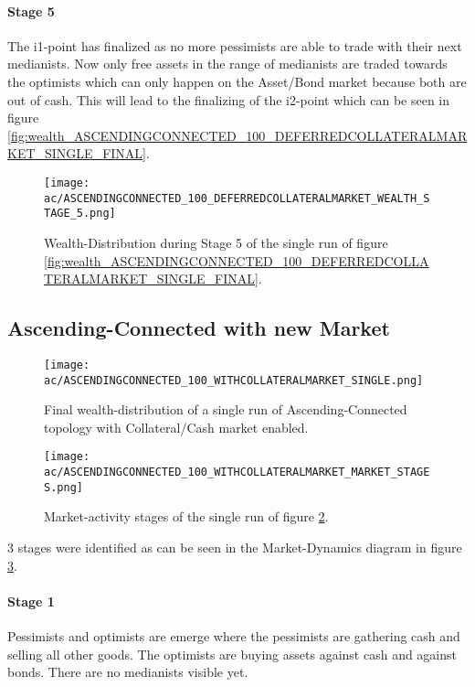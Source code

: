 \documentclass[Bachelorarbeit.tex]{subfiles}
\begin{document}
\paragraph{Stage 5}
The i1-point has finalized as no more pessimists are able to trade with their next medianists. Now only free assets in the range of medianists are traded towards the optimists which can only happen on the Asset/Bond market because both are out of cash. This will lead to the finalizing of the i2-point which can be seen in figure \ref{fig:wealth_ASCENDINGCONNECTED_100_DEFERREDCOLLATERALMARKET_SINGLE_FINAL}.
 
\begin{figure}[H]
	\centering
  \texttt{[image: ac/ASCENDINGCONNECTED\_100\_DEFERREDCOLLATERALMARKET\_WEALTH\_STAGE\_5.png]}
  	\caption{Wealth-Distribution during Stage 5 of the single run of figure \ref{fig:wealth_ASCENDINGCONNECTED_100_DEFERREDCOLLATERALMARKET_SINGLE_FINAL}.}
  	\label{fig:markets_ASCENDINGCONNECTED_100_DEFERREDCOLLATERALMARKET_WEALTH_STAGE_5}
\end{figure}

\subsection{Ascending-Connected with new Market}

\begin{figure}[H]
	\centering
  \texttt{[image: ac/ASCENDINGCONNECTED\_100\_WITHCOLLATERALMARKET\_SINGLE.png]}
  	\caption{Final wealth-distribution of a single run of Ascending-Connected topology with Collateral/Cash market enabled.}
	\label{fig:wealth_ASCENDINGCONNECTED_100_WITHCOLLATERALMARKET_SINGLE}
\end{figure}

\begin{figure}[H]
	\centering
  \texttt{[image: ac/ASCENDINGCONNECTED\_100\_WITHCOLLATERALMARKET\_MARKET\_STAGES.png]}
  	\caption{Market-activity stages of the single run of figure \ref{fig:wealth_ASCENDINGCONNECTED_100_WITHCOLLATERALMARKET_SINGLE}.}
	\label{fig:markets_ASCENDINGCONNECTED_100_WITHCOLLATERALMARKET_MARKET_STAGES}
\end{figure}

3 stages were identified as can be seen in the Market-Dynamics diagram in figure \ref{fig:markets_ASCENDINGCONNECTED_100_WITHCOLLATERALMARKET_MARKET_STAGES}.

\paragraph{Stage 1}
Pessimists and optimists are emerge where the pessimists are gathering cash and selling all other goods. The optimists are buying assets against cash and against bonds. There are no medianists visible yet.
\end{document}

